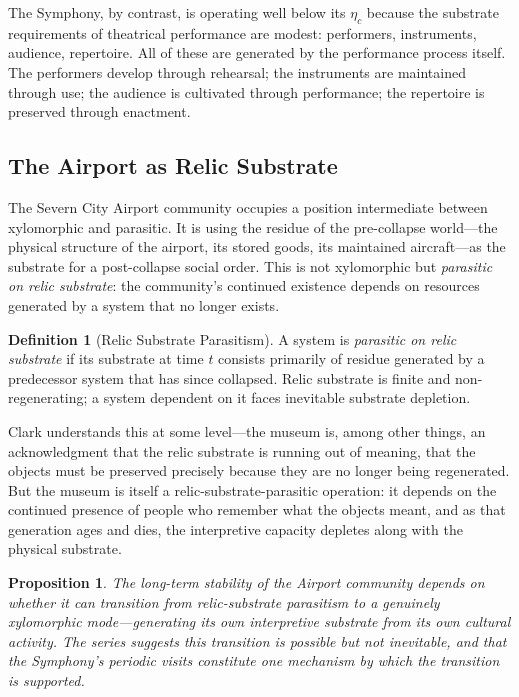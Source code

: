 \documentclass[12pt, oneside]{article}
\theoremstyle{plain}
\newtheorem{proposition}[theorem]{Proposition}
\theoremstyle{definition}
\newtheorem{definition}[theorem]{Definition}
\theoremstyle{remark}
\begin{document}
The Symphony, by contrast, is operating well below its $\eta_c$
because the substrate requirements of theatrical performance are
modest: performers, instruments, audience, repertoire. All of
these are generated by the performance process itself. The
performers develop through rehearsal; the instruments are maintained
through use; the audience is cultivated through performance; the
repertoire is preserved through enactment.

\subsection{The Airport as Relic Substrate}

The Severn City Airport community occupies a position intermediate
between xylomorphic and parasitic. It is using the residue of the
pre-collapse world---the physical structure of the airport, its
stored goods, its maintained aircraft---as the substrate for a
post-collapse social order. This is not xylomorphic but
\emph{parasitic on relic substrate}: the community's continued
existence depends on resources generated by a system that no longer
exists.

\begin{definition}[Relic Substrate Parasitism]
A system is \emph{parasitic on relic substrate} if its substrate
at time $t$ consists primarily of residue generated by a
predecessor system that has since collapsed. Relic substrate is
finite and non-regenerating; a system dependent on it faces
inevitable substrate depletion.
\end{definition}

Clark understands this at some level---the museum is, among other
things, an acknowledgment that the relic substrate is running out
of meaning, that the objects must be preserved precisely because
they are no longer being regenerated. But the museum is itself a
relic-substrate-parasitic operation: it depends on the continued
presence of people who remember what the objects meant, and as
that generation ages and dies, the interpretive capacity depletes
along with the physical substrate.

\begin{proposition}
The long-term stability of the Airport community depends on whether
it can transition from relic-substrate parasitism to a genuinely
xylomorphic mode---generating its own interpretive substrate from
its own cultural activity. The series suggests this transition is
possible but not inevitable, and that the Symphony's periodic
visits constitute one mechanism by which the transition is
supported.
\end{proposition}
\end{document}
